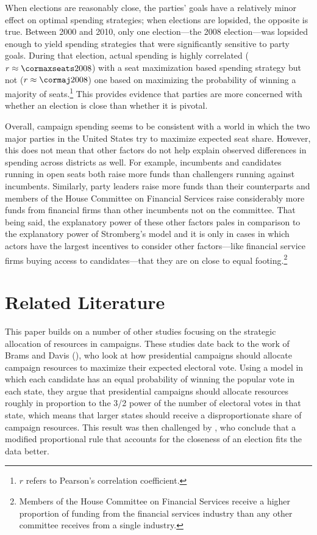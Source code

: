 \documentclass[12pt,final,fleqn]{article}
\theoremstyle{plain}
\begin{document}
When elections are reasonably close, the parties' goals have a relatively minor effect on optimal spending strategies; when elections are lopsided, the opposite is true. Between 2000 and 2010, only one election---the 2008 election---was lopsided enough to yield spending strategies that were significantly sensitive to party goals. During that election, actual spending is highly correlated ($r \approx \cormaxseats2008$) with a seat maximization based spending strategy but not ($r \approx \cormaj2008$) one based on maximizing the probability of winning a majority of seats.\footnote{$r$ refers to Pearson's correlation coefficient.} This provides evidence that parties are more concerned with whether an election is close than whether it is pivotal. 

Overall, campaign spending seems to be consistent with a world in which the two major parties in the United States try to maximize expected seat share. However, this does not mean that other factors do not help explain observed differences in spending across districts as well. For example, incumbents and candidates running in open seats both raise more funds than challengers running against incumbents. Similarly, party leaders raise more funds than their counterparts and members of the House Committee on Financial Services raise considerably more funds from financial firms than other incumbents not on the committee. That being said, the explanatory power of these other factors pales in comparison to the explanatory power of Stromberg's model and it is only in cases in which actors have the largest incentives to consider other factors---like financial service firms buying access to candidates---that they are on close to equal footing.\footnote{Members of the House Committee on Financial Services receive a higher proportion of funding from the financial services industry than any other committee receives from a single industry.}

\section{Related Literature} \label{sec: related literature}
This paper builds on a number of other studies focusing on the strategic allocation of resources in campaigns. These studies date back to the work of Brams and Davis (\citeyear{brams1973resource, brams19743}), who look at how presidential campaigns should allocate campaign resources to maximize their expected electoral vote. Using a model in which each candidate has an equal probability of winning the popular vote in each state, they argue that presidential campaigns should allocate resources roughly in proportion to the 3/2 power of the number of electoral votes in that state, which means that larger states should receive a disproportionate share of campaign resources. This result was then challenged by \citet{colantoni1975campaign}, who conclude that a modified proportional rule that accounts for the closeness of an election fits the data better.
\end{document}
